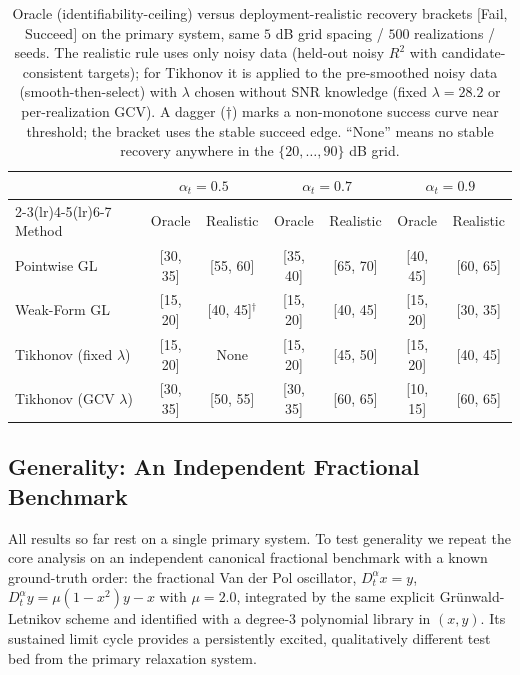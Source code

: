 \documentclass[review,3p,times]{elsarticle}
\begin{document}
\begin{table}[htbp]
\centering
\caption{Oracle (identifiability-ceiling) versus deployment-realistic recovery brackets $[$Fail, Succeed$]$ on the primary system, same $5$ dB grid spacing / $500$ realizations / seeds. The realistic rule uses only noisy data (held-out noisy $R^2$ with candidate-consistent targets); for Tikhonov it is applied to the pre-smoothed noisy data (smooth-then-select) with $\lambda$ chosen without SNR knowledge (fixed $\lambda = 28.2$ or per-realization GCV). A dagger ($\dagger$) marks a non-monotone success curve near threshold; the bracket uses the stable succeed edge. ``None'' means no stable recovery anywhere in the $\{20,\dots,90\}$ dB grid.}
\label{tab:realistic}
\begin{tabular}{lcccccc}
\toprule
& \multicolumn{2}{c}{$\alpha_t = 0.5$} & \multicolumn{2}{c}{$\alpha_t = 0.7$} & \multicolumn{2}{c}{$\alpha_t = 0.9$} \\
\cmidrule(lr){2-3}\cmidrule(lr){4-5}\cmidrule(lr){6-7}
Method & Oracle & Realistic & Oracle & Realistic & Oracle & Realistic \\
\midrule
Pointwise GL & [30, 35] & [55, 60] & [35, 40] & [65, 70] & [40, 45] & [60, 65] \\
Weak-Form GL & [15, 20] & [40, 45]$^\dagger$ & [15, 20] & [40, 45] & [15, 20] & [30, 35] \\
Tikhonov (fixed $\lambda$) & [15, 20] & None & [15, 20] & [45, 50] & [15, 20] & [40, 45] \\
Tikhonov (GCV $\lambda$) & [30, 35] & [50, 55] & [30, 35] & [60, 65] & [10, 15] & [60, 65] \\
\bottomrule
\end{tabular}
\end{table}

\subsection{Generality: An Independent Fractional Benchmark}
\label{sec:benchmark}
All results so far rest on a single primary system. To test generality we repeat the core analysis on an independent canonical fractional benchmark with a known ground-truth order: the fractional Van der Pol oscillator, $D^\alpha_t x = y$, $D^\alpha_t y = \mu(1-x^2)y - x$ with $\mu = 2.0$, integrated by the same explicit Gr\"unwald-Letnikov scheme and identified with a degree-3 polynomial library in $(x,y)$. Its sustained limit cycle provides a persistently excited, qualitatively different test bed from the primary relaxation system.
\end{document}
